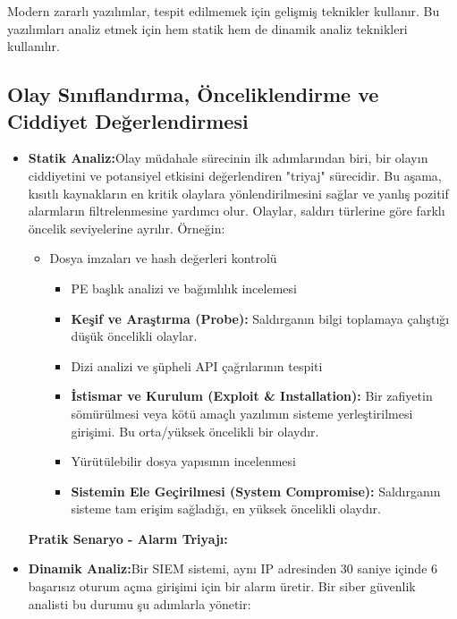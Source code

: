 Modern zararlı yazılımlar, tespit edilmemek için gelişmiş teknikler kullanır. Bu yazılımları analiz etmek için hem statik hem de dinamik analiz teknikleri kullanılır.

\subsection{Olay Sınıflandırma, Önceliklendirme ve Ciddiyet Değerlendirmesi}

\begin{itemize}

    \item \textbf{Statik Analiz:}Olay müdahale sürecinin ilk adımlarından biri, bir olayın ciddiyetini ve potansiyel etkisini değerlendiren "triyaj" sürecidir. Bu aşama, kısıtlı kaynakların en kritik olaylara yönlendirilmesini sağlar ve yanlış pozitif alarmların filtrelenmesine yardımcı olur. Olaylar, saldırı türlerine göre farklı öncelik seviyelerine ayrılır. Örneğin:

    \begin{itemize}

        \item Dosya imzaları ve hash değerleri kontrolü\begin{itemize}

        \item PE başlık analizi ve bağımlılık incelemesi    \item \textbf{Keşif ve Araştırma (Probe):} Saldırganın bilgi toplamaya çalıştığı düşük öncelikli olaylar.

        \item Dizi analizi ve şüpheli API çağrılarının tespiti    \item \textbf{İstismar ve Kurulum (Exploit \& Installation):} Bir zafiyetin sömürülmesi veya kötü amaçlı yazılımın sisteme yerleştirilmesi girişimi. Bu orta/yüksek öncelikli bir olaydır.

        \item Yürütülebilir dosya yapısının incelenmesi    \item \textbf{Sistemin Ele Geçirilmesi (System Compromise):} Saldırganın sisteme tam erişim sağladığı, en yüksek öncelikli olaydır.

    \end{itemize}\end{itemize}

    \textbf{Pratik Senaryo - Alarm Triyajı:}

    \item \textbf{Dinamik Analiz:}Bir SIEM sistemi, aynı IP adresinden 30 saniye içinde 6 başarısız oturum açma girişimi için bir alarm üretir. Bir siber güvenlik analisti bu durumu şu adımlarla yönetir:


\end{itemize}
